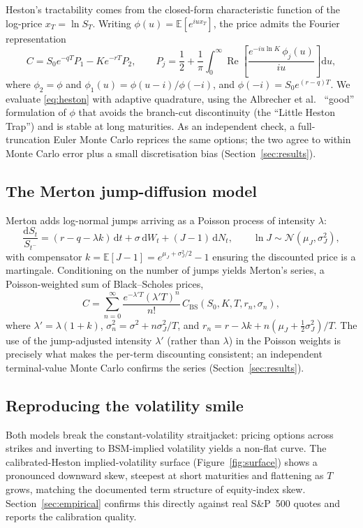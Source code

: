 \documentclass[11pt]{article}
\begin{document}
Heston's tractability comes from the closed-form characteristic function of the
log-price $x_T=\ln S_T$. Writing $\phi(u)=\mathbb{E}[e^{iu x_T}]$, the price
admits the Fourier representation
\begin{equation}
C = S_0 e^{-qT} P_1 - K e^{-rT} P_2, \qquad
P_j = \frac12 + \frac{1}{\pi}\int_0^\infty
\operatorname{Re}\!\left[\frac{e^{-iu\ln K}\,\phi_j(u)}{iu}\right]\mathrm{d}u,
\label{eq:heston}
\end{equation}
where $\phi_2=\phi$ and $\phi_1(u)=\phi(u-i)/\phi(-i)$, and $\phi(-i)=S_0
e^{(r-q)T}$. We evaluate \eqref{eq:heston} with adaptive quadrature, using the
Albrecher et al.\ \citep{albrecher2007} ``good'' formulation of $\phi$ that
avoids the branch-cut discontinuity (the ``Little Heston Trap'') and is stable at
long maturities. As an independent check, a full-truncation Euler Monte Carlo
\citep{lord2010} reprices the same options; the two agree to within Monte Carlo
error plus a small discretisation bias (Section~\ref{sec:results}).

\subsection{The Merton jump-diffusion model}
Merton \citep{merton1976} adds log-normal jumps arriving as a Poisson process of
intensity $\lambda$:
\begin{equation}
\frac{\mathrm{d}S_t}{S_{t^-}} = (r-q-\lambda k)\,\mathrm{d}t + \sigma\,\mathrm{d}W_t
+ (J-1)\,\mathrm{d}N_t, \qquad \ln J \sim \mathcal{N}(\mu_J,\sigma_J^2),
\end{equation}
with compensator $k=\mathbb{E}[J-1]=e^{\mu_J+\sigma_J^2/2}-1$ ensuring the
discounted price is a martingale. Conditioning on the number of jumps yields
Merton's series, a Poisson-weighted sum of Black--Scholes prices,
\begin{equation}
C = \sum_{n=0}^{\infty}\frac{e^{-\lambda' T}(\lambda' T)^n}{n!}\,
C_{\text{BS}}\!\left(S_0,K,T,r_n,\sigma_n\right),
\label{eq:merton}
\end{equation}
where $\lambda'=\lambda(1+k)$,
$\sigma_n^2=\sigma^2+n\sigma_J^2/T$, and $r_n=r-\lambda k+n(\mu_J+\tfrac12\sigma_J^2)/T$.
The use of the jump-adjusted intensity $\lambda'$ (rather than $\lambda$) in the
Poisson weights is precisely what makes the per-term discounting consistent; an
independent terminal-value Monte Carlo confirms the series
(Section~\ref{sec:results}).

\subsection{Reproducing the volatility smile}
Both models break the constant-volatility straitjacket: pricing options across
strikes and inverting to BSM-implied volatility yields a non-flat curve. The
calibrated-Heston implied-volatility surface (Figure~\ref{fig:surface}) shows a
pronounced downward skew, steepest at short maturities and flattening as $T$
grows, matching the documented term structure of equity-index skew.
Section~\ref{sec:empirical} confirms this directly against real S\&P~500 quotes
and reports the calibration quality.
\end{document}
